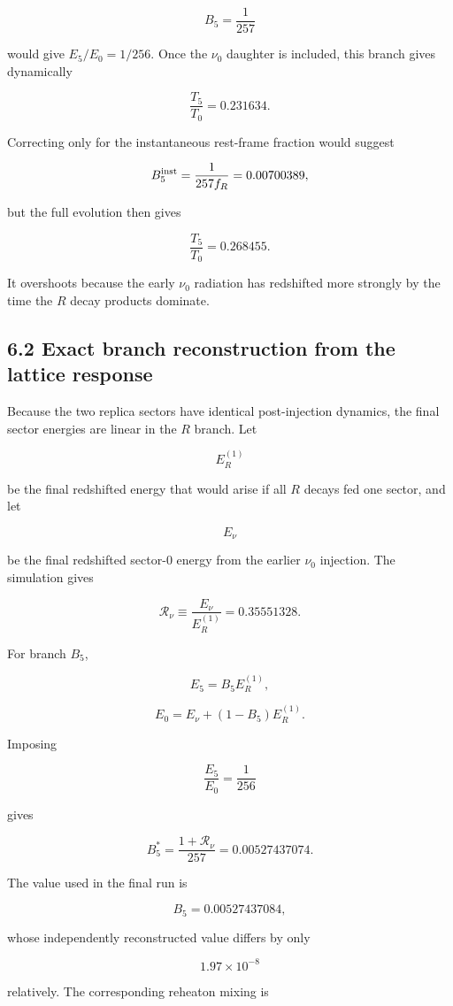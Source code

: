 \documentclass[
  10pt,
]{article}
\begin{document}
\[
B_5=\frac1{257}
\]

would give \(E_5/E_0=1/256\). Once the \(\nu_0\) daughter is included,
this branch gives dynamically

\[
\frac{T_5}{T_0}=0.231634.
\]

Correcting only for the instantaneous rest-frame fraction would suggest

\[
B_5^{\rm inst}
=
\frac{1}{257f_R}
=0.00700389,
\]

but the full evolution then gives

\[
\frac{T_5}{T_0}=0.268455.
\]

It overshoots because the early \(\nu_0\) radiation has redshifted more
strongly by the time the \(R\) decay products dominate.

\subsection{6.2 Exact branch reconstruction from the lattice
response}\label{exact-branch-reconstruction-from-the-lattice-response}

Because the two replica sectors have identical post-injection dynamics,
the final sector energies are linear in the \(R\) branch. Let

\[
E_R^{(1)}
\]

be the final redshifted energy that would arise if all \(R\) decays fed
one sector, and let

\[
E_\nu
\]

be the final redshifted sector-0 energy from the earlier \(\nu_0\)
injection. The simulation gives

\[
\boxed{
\mathcal R_\nu
\equiv
\frac{E_\nu}{E_R^{(1)}}
=0.35551328.
}
\]

For branch \(B_5\),

\[
E_5=B_5E_R^{(1)},
\]

\[
E_0=E_\nu+(1-B_5)E_R^{(1)}.
\]

Imposing

\[
\frac{E_5}{E_0}=\frac1{256}
\]

gives

\[
\boxed{
B_5^*
=
\frac{1+\mathcal R_\nu}{257}
=0.00527437074.
}
\]

The value used in the final run is

\[
B_5=0.00527437084,
\]

whose independently reconstructed value differs by only

\[
1.97\times10^{-8}
\]

relatively. The corresponding reheaton mixing is
\end{document}
